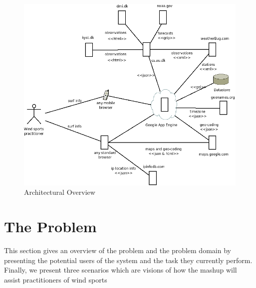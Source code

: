 





\begin{figure}[htbp]
  \centering
  \includegraphics[width=\textwidth]{./Figures/arch_overview}
  \caption{Architectural Overview}
  \label{fig:tech_diagram}
\end{figure}

\section{The Problem}
This section gives an overview of the problem and the problem domain by
presenting the potential users of the system and the task they currently
perform. Finally, we present three scenarios which are visions of how the mashup
will assist practitioners of wind sports

